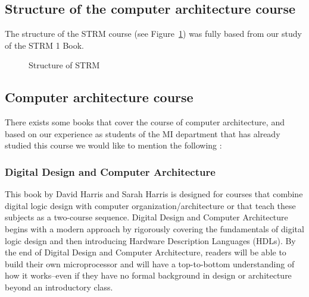 \subsection{Structure of the computer architecture course}
The structure of the STRM course (see Figure~\ref{fig:STRM}) was fully based from our study of the STRM 1 Book\cite{STRM-1-Book-Taha-Zerrouki}.

\begin{figure} [h!]%
 	\vspace*{13pt}
 	\vspace*{13pt}               
 	\caption{Structure of STRM} 
 	\label{fig:STRM}
 \end{figure} 

 \subsection{Computer architecture course}
 There exists some books that cover the course of computer architecture, and based on our experience as students of the MI department that has already studied this course 
 we would like to mention the following :
 \subsubsection{Digital Design and Computer Architecture }
This book by David Harris and Sarah Harris is designed for courses that combine digital logic design with computer organization/architecture or that teach these subjects
as a two-course sequence. Digital Design and Computer Architecture begins with a modern approach by rigorously covering the fundamentals
of digital logic design and then introducing Hardware Description Languages (HDLs). By the end of Digital Design and Computer Architecture,
readers will be able to build their own microprocessor and will have a top-to-bottom understanding of how it works--even if they have no formal background
in design or architecture beyond an introductory class. \cite{harris2010digital}

